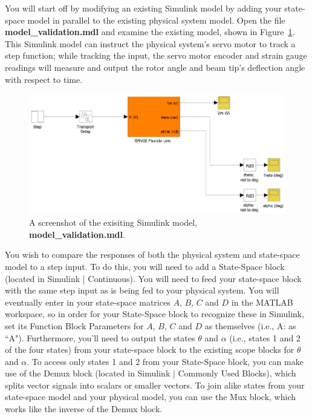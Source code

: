 \documentclass[12pt]{report}
\newcommand\drew[1]{\textcolor{red}{#1}}
\begin{document}
You will start off by modifying an existing Simulink model by adding your state-space model in parallel to the existing physical system model. Open the file \\ \textbf{model\_validation.mdl} and examine the existing model, shown in Figure~\ref{fig:lab1_model_validation_student}. This Simulink model can instruct the physical system's servo motor to track a step function; while tracking the input, the servo motor encoder and strain gauge readings will measure and output the rotor angle and beam tip's deflection angle with respect to time.
\begin{figure}[htb!]
    \centering
    \includegraphics[width=.7\linewidth]{eps/lab_1/model_validation_student.eps}
    \caption{A screenshot of the exisiting Simulink model, \textbf{model\_validation.mdl}.}
    \label{fig:lab1_model_validation_student}
\end{figure}

You wish to compare the responses of both the physical system and state-space model to a step input. To do this, you will need to add a State-Space block (located in Simulink | Continuous). You will need to feed your state-space block with the same step input as is being fed to your physical system. You will eventually enter in your state-space matrices $A$, $B$, $C$ and $D$ in the MATLAB workspace, so in order for your State-Space block to recognize these in Simulink, set its Function Block Parameters for $A$, $B$, $C$ and $D$ as themselves (i.e., A: as ``A"). Furthermore, you'll need to output the states $\theta$ and $\alpha$ (i.e., states 1 and 2 of the four states) from your state-space block to the existing scope blocks for $\theta$ and $\alpha$. To access only states 1 and 2 from your State-Space block, you can make use of the Demux block (located in Simulink | Commonly Used Blocks), which splits vector signals into scalars or smaller vectors. To join alike states from your state-space model and your physical model, you can use the Mux block, which works like the inverse of the Demux block.\\
\end{document}
